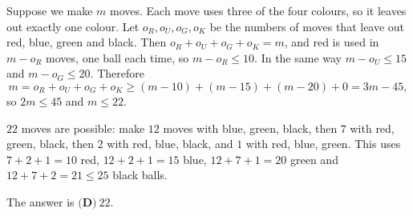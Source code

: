 Suppose we make $m$ moves. Each move uses three of the four colours, so it leaves out exactly one colour. Let $o_R,o_U,o_G,o_K$ be the numbers of moves that leave out red, blue, green and black. Then $o_R+o_U+o_G+o_K=m$, and red is used in $m-o_R$ moves, one ball each time, so $m-o_R\le10$. In the same way $m-o_U\le15$ and $m-o_G\le20$. Therefore
\[
m=o_R+o_U+o_G+o_K\ge(m-10)+(m-15)+(m-20)+0=3m-45,
\]
so $2m\le45$ and $m\le22$.

$22$ moves are possible: make $12$ moves with blue, green, black, then $7$ with red, green, black, then $2$ with red, blue, black, and $1$ with red, blue, green. This uses $7+2+1=10$ red, $12+2+1=15$ blue, $12+7+1=20$ green and $12+7+2=21\le25$ black balls.

The answer is $\boxed{\textbf{(D)}\ 22}$.
